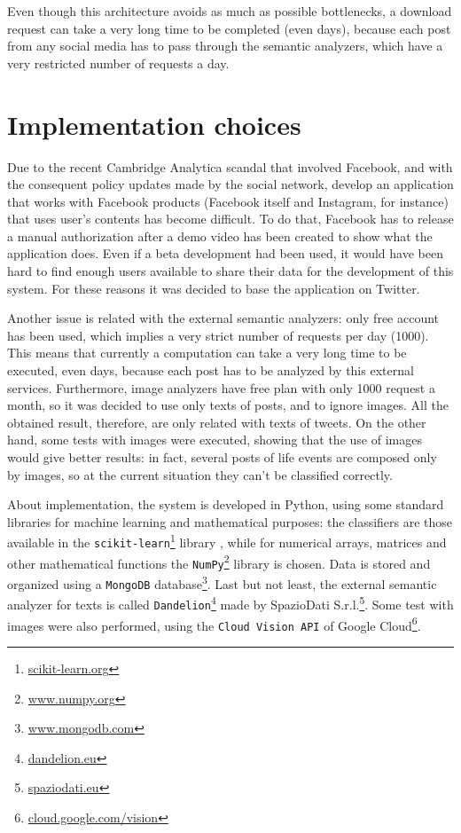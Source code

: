 Even though this architecture avoids as much as possible bottlenecks, a download request can take a very long time to be completed (even days), because each post from any social media has to pass through the semantic analyzers, which have a very restricted number of requests a day.

\section{Implementation choices}
Due to the recent Cambridge Analytica scandal that involved Facebook, and with the consequent policy updates made by the social network, develop an application that works with Facebook products (Facebook itself and Instagram, for instance) that uses user's contents has become difficult. To do that, Facebook has to release a manual authorization after a demo video has been created to show what the application does. Even if a beta development had been used, it would have been hard to find enough users available to share their data for the development of this system. For these reasons it was decided to base the application on Twitter.

Another issue is related with the external semantic analyzers: only free account has been used, which implies a very strict number of requests per day (1000). This means that currently a computation can take a very long time to be executed, even days, because each post has to be analyzed by this external services. Furthermore, image analyzers have free plan with only 1000 request a month, so it was decided to use only texts of posts, and to ignore images. All the obtained result, therefore, are only related with texts of tweets. On the other hand, some tests with images were executed, showing that the use of images would give better results: in fact, several posts of life events are composed only by images, so at the current situation they can't be classified correctly.

About implementation, the system is developed in Python, using some standard libraries for machine learning and mathematical purposes: the classifiers  
are those available in the \texttt{scikit-learn}\footnote{\url{scikit-learn.org}} library \cite{scikit-learn}, while for numerical arrays, matrices and other mathematical functions the \texttt{NumPy}\footnote{\url{www.numpy.org}} library \cite{oliphant2006guide} is chosen. Data is stored and organized using a \texttt{MongoDB} database\footnote{\url{www.mongodb.com}}. Last but not least, the external semantic analyzer for texts is called \texttt{Dandelion}\footnote{\url{dandelion.eu}} made by SpazioDati S.r.l.\footnote{\url{spaziodati.eu}}. Some test with images were also performed, using the \texttt{Cloud Vision API} of Google Cloud\footnote{\url{cloud.google.com/vision}}.

